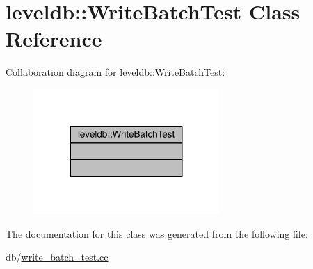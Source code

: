 \hypertarget{classleveldb_1_1_write_batch_test}{}\section{leveldb\+:\+:Write\+Batch\+Test Class Reference}
\label{classleveldb_1_1_write_batch_test}


Collaboration diagram for leveldb\+:\+:Write\+Batch\+Test\+:\nopagebreak
\begin{figure}[H]
\begin{center}
\leavevmode
\includegraphics[width=200pt]{classleveldb_1_1_write_batch_test__coll__graph}
\end{center}
\end{figure}


The documentation for this class was generated from the following file\+:\begin{DoxyCompactItemize}
\item 
db/\hyperlink{write__batch__test_8cc}{write\+\_\+batch\+\_\+test.\+cc}\end{DoxyCompactItemize}
